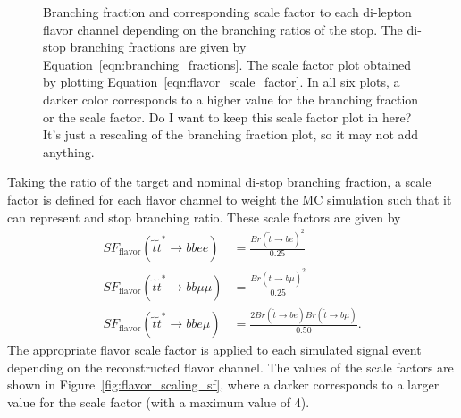 \begin{figure}[ht]
  \centering
  \caption{Branching fraction and corresponding scale factor to each di-lepton
    flavor channel depending on the branching ratios of the stop.
    The di-stop branching fractions are given by
    Equation~\ref{eqn:branching_fractions}.
    The scale factor plot obtained by plotting
    Equation~\ref{eqn:flavor_scale_factor}.
    In all six plots, a darker color corresponds to a higher value for the
    branching fraction or the scale factor.
    {\color{red} Do I want to keep this scale factor plot in here? It's just a
      rescaling of the branching fraction plot, so it may not add anything.
    }
  }
  \label{fig:flavor_scaling}
\end{figure}

Taking the ratio of the target and nominal di-stop branching fraction, a
scale factor is defined for each flavor channel to weight the MC simulation
such that it can represent and stop branching ratio.
These scale factors are given by
\begin{equation}
  \label{eqn:flavor_scale_factor}
  \begin{aligned}
    SF_\mathrm{flavor}(\tilde{t}\tilde{t}^{*} \rightarrow bbee)     &=
      \frac{Br(\tilde{t} \rightarrow be)^2}{0.25} \\
    SF_\mathrm{flavor}(\tilde{t}\tilde{t}^{*} \rightarrow bb\mu\mu) &=
      \frac{Br(\tilde{t} \rightarrow b\mu)^2}{0.25} \\
    SF_\mathrm{flavor}(\tilde{t}\tilde{t}^{*} \rightarrow bbe\mu)   &=
      \frac{2Br(\tilde{t} \rightarrow be)Br(\tilde{t} \rightarrow b\mu)}{0.50}.
  \end{aligned}
\end{equation}
The appropriate flavor scale factor is applied to each simulated signal event
depending on the reconstructed flavor channel.
The values of the scale factors are shown in Figure~\ref{fig:flavor_scaling_sf},
where a darker corresponds to a larger value for the scale factor (with a
maximum value of 4).

